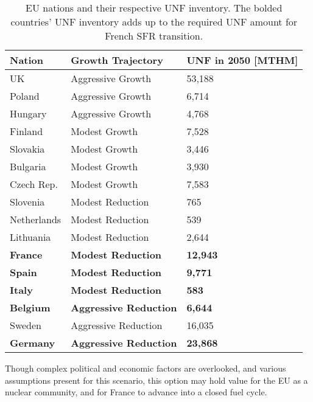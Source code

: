 \begin{table}[h]
    \centering
                \begin{tabularx}{\textwidth}{lbb}
                       \hline 
                    
                    \textbf{Nation} & \textbf{Growth Trajectory} & \small{\textbf{UNF in 2050 [MTHM] }}\\
                    \hline
                    UK & Aggressive Growth & 53,188\\
                    \hline
                    Poland & Aggressive Growth & 6,714\\
                    \hline
                    Hungary & Aggressive Growth & 4,768 \\ 
                    \hline
                    Finland & Modest Growth &  7,528\\
                    \hline
                    Slovakia & Modest Growth & 3,446\\
                    \hline
                    Bulgaria & Modest Growth & 3,930 \\
                    \hline
                    Czech Rep. & Modest Growth & 7,583\\
                    \hline
                    Slovenia & Modest Reduction & 765\\
                    \hline
                    Netherlands & Modest Reduction & 539\\
                    \hline
                    Lithuania & Modest Reduction & 2,644 \\
                    \hline
                    \textbf{France} & \textbf{Modest Reduction} & \textbf{12,943} \\
                    \hline 
                    \textbf{Spain} & \textbf{Modest Reduction} &  \textbf{9,771} \\
                    \hline
                    \textbf{Italy} & \textbf{Modest Reduction} & \textbf{583}\\
                    \hline
                    \textbf{Belgium} & \textbf{Aggressive Reduction} & \textbf{6,644}\\
                    \hline
                    Sweden & Aggressive Reduction & 16,035\\
                    \hline
                    \textbf{Germany} & \textbf{Aggressive Reduction} & \textbf{23,868}\\
                    \hline
                \end{tabularx}
    \caption {\gls{EU} nations and their respective \gls{UNF} inventory. The bolded countries'
              \gls{UNF} inventory adds up to the required \gls{UNF} amount for French \gls{SFR} transition. }
    \label{tab:which_send}
\end{table}

Though complex political and economic factors are overlooked,
 and various assumptions present for this scenario,
this option may hold value for the \gls{EU} as a nuclear community,
and for France to advance into a closed fuel cycle.
